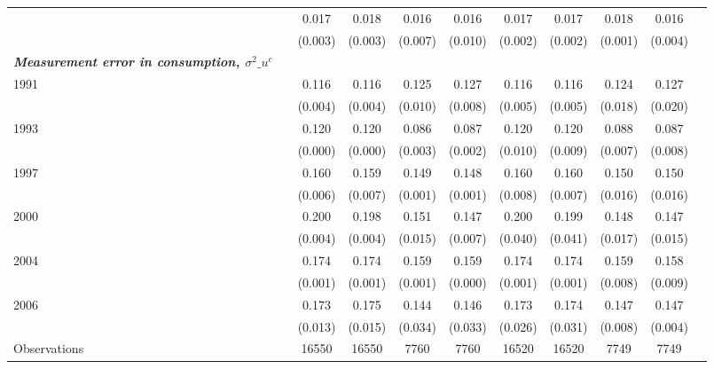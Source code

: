 \begin{tabular}{l*{10}{c}}
\hspace{.3cm}       &            &       0.017&       0.018&       0.016&       0.016&       0.017&       0.017&       0.018&       0.016\\
                    &            &     (0.003)&     (0.003)&     (0.007)&     (0.010)&     (0.002)&     (0.002)&     (0.001)&     (0.004)\\
\textbf{\emph{Measurement error in consumption, $\sigma^2\_{u^c}$}}&            &            &            &            &            &            &            &            &            \\
\hspace{.3cm} 1991  &            &       0.116&       0.116&       0.125&       0.127&       0.116&       0.116&       0.124&       0.127\\
                    &            &     (0.004)&     (0.004)&     (0.010)&     (0.008)&     (0.005)&     (0.005)&     (0.018)&     (0.020)\\
\hspace{.3cm} 1993  &            &       0.120&       0.120&       0.086&       0.087&       0.120&       0.120&       0.088&       0.087\\
                    &            &     (0.000)&     (0.000)&     (0.003)&     (0.002)&     (0.010)&     (0.009)&     (0.007)&     (0.008)\\
\hspace{.3cm} 1997  &            &       0.160&       0.159&       0.149&       0.148&       0.160&       0.160&       0.150&       0.150\\
                    &            &     (0.006)&     (0.007)&     (0.001)&     (0.001)&     (0.008)&     (0.007)&     (0.016)&     (0.016)\\
\hspace{.3cm} 2000  &            &       0.200&       0.198&       0.151&       0.147&       0.200&       0.199&       0.148&       0.147\\
                    &            &     (0.004)&     (0.004)&     (0.015)&     (0.007)&     (0.040)&     (0.041)&     (0.017)&     (0.015)\\
\hspace{.3cm} 2004  &            &       0.174&       0.174&       0.159&       0.159&       0.174&       0.174&       0.159&       0.158\\
                    &            &     (0.001)&     (0.001)&     (0.001)&     (0.000)&     (0.001)&     (0.001)&     (0.008)&     (0.009)\\
\hspace{.3cm} 2006  &            &       0.173&       0.175&       0.144&       0.146&       0.173&       0.174&       0.147&       0.147\\
                    &            &     (0.013)&     (0.015)&     (0.034)&     (0.033)&     (0.026)&     (0.031)&     (0.008)&     (0.004)\\
\midrule
Observations        &            &       16550&       16550&        7760&        7760&       16520&       16520&        7749&        7749\\
\bottomrule
\end{tabular}
